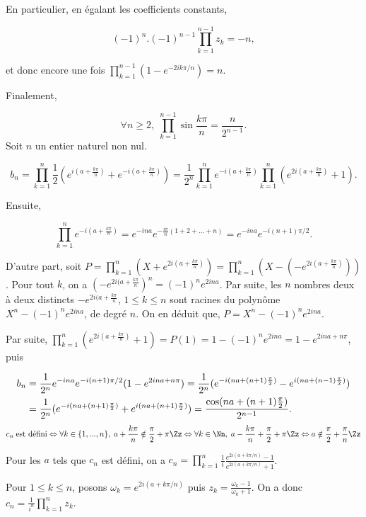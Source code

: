 {{\begin{itemize}
En particulier, en égalant les coefficients constants,

$$(-1)^n.(-1)^{n-1}\prod_{k=1}^{n-1}z_k=-n,$$

et donc encore une fois $\prod_{k=1}^{n-1}(1-e^{-2ik\pi/n})=n$.
\end{itemize}

Finalement,

$$\forall n\geq2,\;\prod_{k=1}^{n-1}\sin\frac{k\pi}{n}=\frac{n}{2^{n-1}}.$$
Soit $n$ un entier naturel non nul.

$$b_n=\prod_{k=1}^{n}\frac{1}{2}(e^{i(a+\frac{k\pi}{n})}+e^{-i(a+\frac{k\pi}{n})})=\frac{1}{2^n}\prod_{k=1}^{n}e^{-i(a+\frac{k\pi}{n})}\prod_{k=1}^{n}(e^{2i(a+\frac{k\pi}{n})}+1).$$

Ensuite, 

$$\prod_{k=1}^{n}e^{-i(a+\frac{k\pi}{n})}=e^{-ina}e^{-\frac{i\pi}{n}(1+2+...+n)}=e^{-ina}e^{-i(n+1)\pi/2}.$$

D'autre part, soit $P=\prod_{k=1}^{n}(X+e^{2i(a+\frac{k\pi}{n})})=\prod_{k=1}^{n}(X-(-e^{2i(a+\frac{k\pi}{n})}))$.
Pour tout $k$, on a $(-e^{2i(a+\frac{k\pi}{n}})^n=(-1)^ne^{2ina}$. Par suite, les $n$ nombres deux à deux distincts $-e^{2i(a+\frac{k\pi}{n}}$, $1\leq k\leq n$ sont racines du polynôme $X^n-(-1)^ne^{2ina}$, de degré $n$. On en déduit que, $P=X^n-(-1)^ne^{2ina}$.

Par suite, $\prod_{k=1}^{n}(e^{2i(a+\frac{k\pi}{n})}+1)=P(1)=1-(-1)^ne^{2ina}=1-e^{2ina+n\pi}$, puis 

\begin{align*}\ensuremath
b_n&=\frac{1}{2^n}e^{-ina}e^{-i(n+1)\pi/2}(1-e^{2ina+n\pi})=\frac{1}{2^n}(e^{-i(na+(n+1)\frac{\pi}{2})}-e^{i(na+(n-1)\frac{\pi}{2})})\\
 &=\frac{1}{2^n}(e^{-i(na+(n+1)\frac{\pi}{2})}+e^{i(na+(n+1)\frac{\pi}{2})})=\frac{\cos(na+(n+1)\frac{\pi}{2})}{2^{n-1}}.
\end{align*}
\begin{align*}\ensuremath
c_n\;\mbox{est défini}\Leftrightarrow\forall k\in\{1,...,n\},\;a+\frac{k\pi}{n}\notin\frac{\pi}{2}+\pi\Zz\Leftrightarrow\forall k\in\Nn,\;a-\frac{k\pi}{n}+\frac{\pi}{2}+\pi\Zz\Leftrightarrow a\notin\frac{\pi}{2}+\frac{\pi}{n}\Zz
\end{align*}

Pour les $a$ tels que $c_n$ est défini, on a $c_n=\prod_{k=1}^{n}\frac{1}{i}\frac{e^{2i(a+k\pi/n)}-1}{e^{2i(a+k\pi/n)}+1}$.

Pour $1\leq k\leq n$, posons $\omega_k=e^{2i(a+k\pi/n)}$ puis $z_k=\frac{\omega_k-1}{\omega_k+1}$. On a donc $c_n=\frac{1}{i^n}\prod_{k=1}^{n}z_k$.

}}
